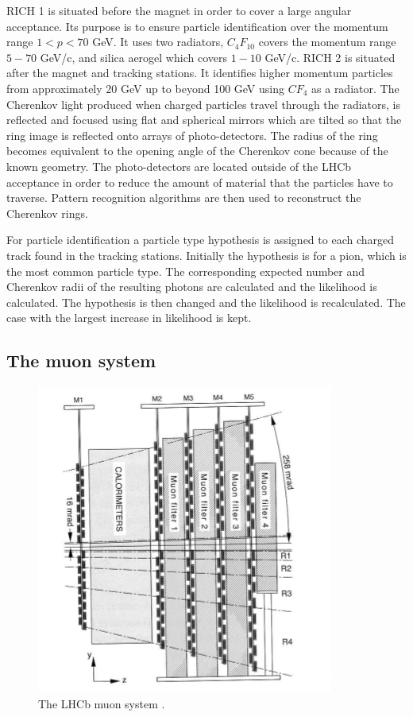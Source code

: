 RICH 1 is situated before the magnet in order to cover a large angular acceptance. Its purpose is to ensure
particle identification over the momentum range $1 < p < 70$ GeV. It uses two radiators, $C_4F_{10}$ covers
the momentum range $5 - 70$ GeV/c, and silica aerogel which covers $1 - 10$ GeV/c. RICH 2 is situated after
the magnet and tracking stations. It identifies higher momentum particles from approximately 20 GeV up to beyond
100 GeV using $CF_4$ as a radiator.
The Cherenkov light produced when charged particles travel through the radiators, is reflected and focused using
flat and spherical mirrors which are tilted so that the ring image is reflected onto arrays of photo-detectors.
The radius of the ring becomes equivalent to the opening angle of the Cherenkov cone because of the known geometry.
The photo-detectors are located outside of the LHCb acceptance in order to reduce the amount of material that
the particles have to traverse. Pattern recognition algorithms are then used to reconstruct the Cherenkov rings.

For particle identification a particle type hypothesis is assigned to each charged track found in the tracking stations.
Initially the hypothesis is for a pion, which is the most common particle type. The corresponding expected number and
Cherenkov radii of the resulting photons are calculated and the likelihood is calculated. The hypothesis is then changed
and the likelihood is recalculated. The case with the largest increase in likelihood is kept.


\subsection{The muon system}

\begin{figure}[b!]
\label{muonsystem}
\centering \includegraphics[width=0.5\linewidth]{Detector/figs/muonsystem.png}
\caption{The LHCb muon system \cite{Alves:2008zz}.}
\end{figure}

